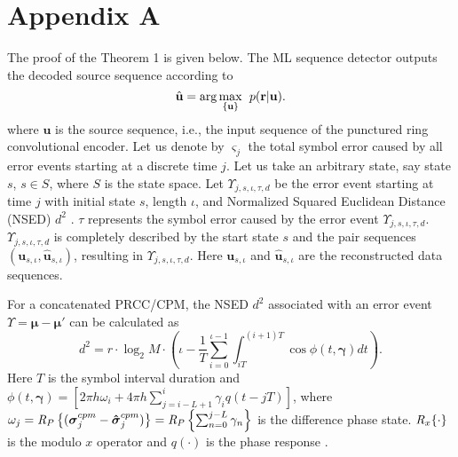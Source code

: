 \documentclass[12pt,twoside,onecolumn,a4paper,english]{IEEEtran2e}
\begin{document}
\section*{Appendix A}
The proof of the Theorem 1 is given below.
The ML sequence detector outputs the decoded source sequence according to
\begin{equation}
\hat{\textbf u}=\arg%
\max_{\{{\textbf u}\}}\hspace{1ex}p(\textbf{r}|\textbf{u}).
\end{equation}
where $\textbf{u}$ is the source sequence, i.e., the input sequence of the punctured ring convolutional encoder.
Let us denote by $\varsigma_j$  the total symbol error caused by all error
events starting at a discrete time $j$. Let us take an arbitrary state,
say state $s$, $s\in{S}$, where $S$ is the state space. Let
$\Upsilon_{j,s,\iota,\tau,d}$ be the error event starting at time $j$
with initial state $s$, length $\iota$, and Normalized Squared
Euclidean Distance (NSED) $d^2$ \cite{anderson}. $\tau$ represents
the symbol error caused by the error event $\Upsilon_{j,s,\iota,\tau,d}$.
$\Upsilon_{j,s,\iota,\tau,d}$ is completely described by the start state
$s$ and the pair sequences
$(\mathbf{\boldsymbol{u}}_{s,\iota},\hat{\mathbf{\boldsymbol{u}}}_{s,\iota})$,
resulting in $\Upsilon_{j,s,\iota,\tau,d}$. Here
$\mathbf{\boldsymbol{u}}_{s,\iota}$ and
$\hat{\mathbf{\boldsymbol{u}}}_{s,\iota}$ are the reconstructed data
sequences.

For a concatenated PRCC/CPM, the NSED $d^2$ associated with an
error event $\Upsilon=\boldsymbol{\mu}- \boldsymbol{\mu}'$ can be
calculated as
\begin{equation}\label{eq:d2}%
d^2=r{\cdot}\log_2M{\cdot}\left(\iota-\frac{1}{T}\sum_{i=0}^{\iota-1}\int_{iT}^{(i+1)T}\cos
\phi(t,{\boldsymbol{\gamma}})dt\right).
\end{equation}
Here $T$ is the symbol interval duration and
$\phi(t,{\boldsymbol{\gamma}})=[2{\pi}h\omega_i+4{\pi}h\sum_{j=i-L+1}^{i}\gamma_iq(t-jT)]$,
where
$\omega_j=\emph{R}_P\left\{({\boldsymbol{\sigma}}_j^{cpm}-{\boldsymbol{\hat\sigma}}_j^{cpm})\right\}=\emph{R}_P\left\{\sum_{n=0}^{j-L}\gamma_n\right\}$
is the difference phase state.
$\emph{R}_x\{\cdot\}$ is the modulo $x$ operator and $q(\cdot)$ is
the phase response \cite{anderson}.
\end{document}
